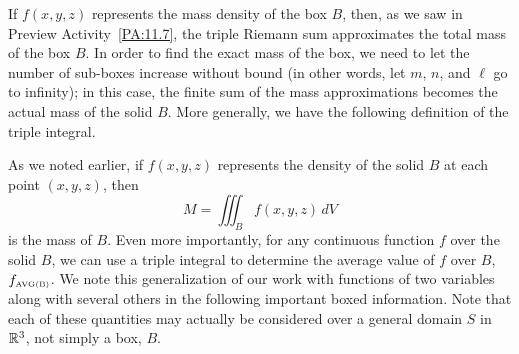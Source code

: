 If $f(x,y,z)$ represents the mass density of the box $B$, then, as we saw in Preview Activity~\ref{PA:11.7}, the triple Riemann sum approximates the total mass of the box $B$. In order to find the exact mass of the box, we need to let the number of sub-boxes increase without bound (in other words, let $m$, $n$, and $\ell$ go to infinity); in this case, the finite sum of the mass approximations becomes the actual mass of the solid $B$.   More generally, we have the following definition of the triple integral.

\vspace*{5pt}
\nin {}
\vspace*{5pt}

As we noted earlier, if $f(x, y, z)$ represents the density of the solid $B$ at each point $(x, y, z)$, then
 \[M = \iiint_B f(x,y,z) \, dV\]
 is the mass of $B$.  Even more importantly, for any continuous function $f$ over the solid $B$, we can use a triple integral to determine the average value of $f$ over $B$, $f_{\mbox{\tiny{AVG}(B)}}$.  We note this generalization of our work with functions of two variables along with several others in the following important boxed information.  Note that each of these quantities may actually be considered over a general domain $S$ in $\mathbb{R}^3$, not simply a box, $B$.


